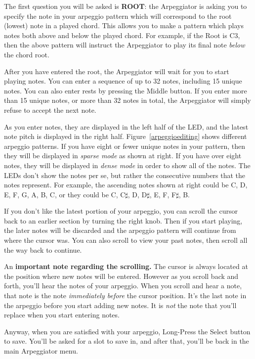 \documentclass{article}
\begin{document}
The first question you will be asked is {\bf ROOT}: the Arpeggiator is asking you to specify the note in your arpeggio pattern which will correspond to the root (lowest) note in a played chord.  This allows you to make a pattern which plays notes both above and below the played chord.  For example, if the Root is C3, then the above pattern will instruct the Arpeggiator to play its final note {\it below} the chord root.

After you have entered the root, the Arpeggiator will wait for you to start playing notes.  You can enter a sequence of up to 32 notes, including 15 unique notes.  You can also enter rests by pressing the Middle button.  If you enter more than 15 unique notes, or more than 32 notes in total, the Arpeggiator will simply refuse to accept the next note.

As you enter notes, they are displayed in the left half of the LED, and the latest note pitch is displayed in the right half. Figure~\ref{arpeggioediting} shows different arpeggio patterns.  If you have eight or fewer unique notes in your pattern, then they will be displayed in {\it sparse mode} as shown at right.  If you have over eight notes, they will be displayed in {\it dense mode} in order to show all of the notes.  The LEDs don't show the notes per se, but rather the consecutive numbers that the notes represent.  For example, the ascending notes shown at right could be C, D, E, F, G, A, B, C, or they could be C, C\(\sharp\), D, D\(\sharp\), E, F, F\(\sharp\), B.

If you don't like the latest portion of your arpeggio, you can scroll the cursor back to an earlier section by turning the right knob.  Then if you start playing, the later notes will be discarded and the arpeggio pattern will continue from where the cursor was.  You can also scroll to view your past notes, then scroll all the way back to continue.

An {\bf important note regarding the scrolling.}  The cursor is always located at the position where new notes will be entered.  However as you scroll back and forth, you'll hear the notes of your arpeggio.  When you scroll and hear a note, that note is the note {\it immediately before} the cursor position.  It's the last note in the arpeggio before you start adding new notes. It is {\it not} the note that you'll replace when you start entering notes. 

Anyway, when you are satisfied with your arpeggio, Long-Press the Select button to save.  You'll be asked for a slot to save in, and after that, you'll be back in the main Arpeggiator menu.
\end{document}
